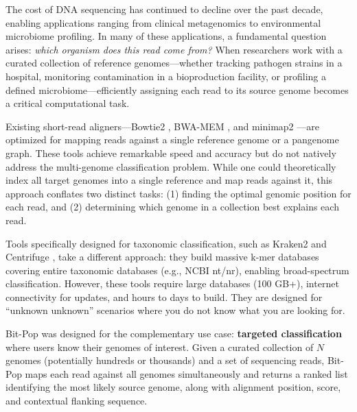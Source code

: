 \documentclass{article}
\begin{document}
The cost of DNA sequencing has continued to decline over the past decade, enabling applications ranging from clinical metagenomics to environmental microbiome profiling. In many of these applications, a fundamental question arises: \textit{which organism does this read come from?} When researchers work with a curated collection of reference genomes---whether tracking pathogen strains in a hospital, monitoring contamination in a bioproduction facility, or profiling a defined microbiome---efficiently assigning each read to its source genome becomes a critical computational task.

Existing short-read aligners---Bowtie2 \citep{langmead2012}, BWA-MEM \citep{li2013}, and minimap2 \citep{li2018}---are optimized for mapping reads against a single reference genome or a pangenome graph. These tools achieve remarkable speed and accuracy but do not natively address the multi-genome classification problem. While one could theoretically index all target genomes into a single reference and map reads against it, this approach conflates two distinct tasks: (1) finding the optimal genomic position for each read, and (2) determining which genome in a collection best explains each read.

Tools specifically designed for taxonomic classification, such as Kraken2 \citep{wood2019} and Centrifuge \citep{kim2016}, take a different approach: they build massive k-mer databases covering entire taxonomic databases (e.g., NCBI nt/nr), enabling broad-spectrum classification. However, these tools require large databases (100 GB+), internet connectivity for updates, and hours to days to build. They are designed for ``unknown unknown'' scenarios where you do not know what you are looking for.

Bit-Pop was designed for the complementary use case: \textbf{targeted classification} where users know their genomes of interest. Given a curated collection of $N$ genomes (potentially hundreds or thousands) and a set of sequencing reads, Bit-Pop maps each read against all genomes simultaneously and returns a ranked list identifying the most likely source genome, along with alignment position, score, and contextual flanking sequence.
\end{document}
